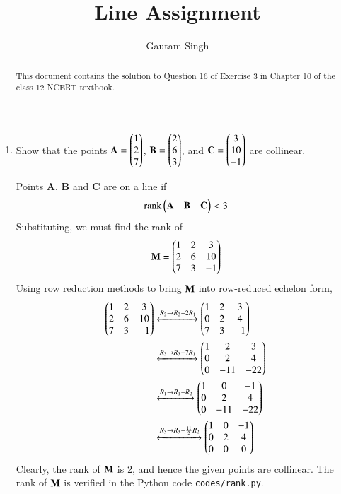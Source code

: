 \documentclass[journal,12pt,twocolumn]{IEEEtran}
\let\vec\mathbf
\begin{document}
\vspace{3cm}
\title{Line Assignment}
\author{Gautam Singh}
\maketitle
\bigskip

\begin{abstract}
    This document contains the solution to Question 16 of Exercise 3 in Chapter
    10 of the class 12 NCERT textbook.
\end{abstract}

\begin{enumerate}
    \item Show that the points $\vec{A} = \myvec{1\\2\\7}$, $\vec{B} = 
    \myvec{2\\6\\3}$, and $\vec{C} = \myvec{3\\10\\-1}$ are collinear.

    \solution Points $\vec{A}$, $\vec{B}$ and $\vec{C}$ are on a line if
    \begin{align}
        \textrm{rank}\myvec{\vec{A} & \vec{B} & \vec{C}} < 3
        \label{eq:rank-collinear}
    \end{align}
    Substituting, we must find the rank of
    \begin{align}
        \mathbf{M} = \begin{pmatrix}1&2&3\\2&6&10\\7&3&-1\end{pmatrix}
    \end{align}
    Using row reduction methods to bring $\mathbf{M}$ into row-reduced echelon
    form,
    \begin{align}
        \begin{pmatrix}1&2&3\\2&6&10\\7&3&-1\end{pmatrix}&\xleftrightarrow[]{R_2\rightarrow R_2-2R_1}
        \begin{pmatrix}1&2&3\\0&2&4\\7&3&-1\end{pmatrix} \\
                &\xleftrightarrow[]{R_3\rightarrow R_3-7R_1}\begin{pmatrix}1&2&3\\0&2&4\\0&-11&-22\end{pmatrix} \\
                &\xleftrightarrow[]{R_1\rightarrow R_1-R_2}\begin{pmatrix}1&0&-1\\0&2&4\\0&-11&-22\end{pmatrix} \\
                &\xleftrightarrow[]{R_3\rightarrow R_3+\frac{11}{2}R_2}\begin{pmatrix}1&0&-1\\0&2&4\\0&0&0\end{pmatrix}
                \label{eq:row-red}
    \end{align}
    Clearly, the rank of $\mathbf{M}$ is 2, and hence the given points are 
    collinear. The rank of $\mathbf{M}$ is verified in the Python code 
    \texttt{codes/rank.py}.


\end{enumerate}
\end{document}
